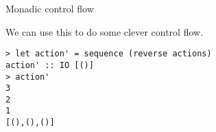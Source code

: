 %
\begin{frame}[fragile]{Monadic control flow}

We can use this to do some clever control flow.

\begin{block}{}
\begin{verbatim}
> let action' = sequence (reverse actions)
action' :: IO [()]
> action'
3
2
1
[(),(),()]
\end{verbatim}
\end{block}

\end{frame}



